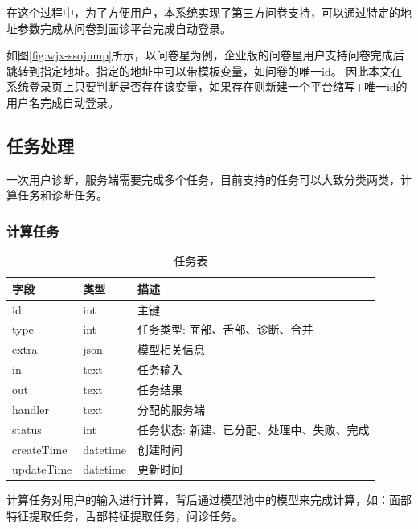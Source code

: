在这个过程中，为了方便用户，本系统实现了第三方问卷支持，可以通过特定的地址参数完成从问卷到面诊平台完成自动登录。

如图\ref{fig:wjx-ssojump}所示，以问卷星为例，企业版的问卷星用户支持问卷完成后跳转到指定地址。指定的地址中可以带模板变量，如问卷的唯一id。
因此本文在系统登录页上只要判断是否存在该变量，如果存在则新建一个平台缩写+唯一id的用户名完成自动登录。


\subsection{任务处理}
一次用户诊断，服务端需要完成多个任务，目前支持的任务可以大致分类两类，计算任务和诊断任务。


\subsubsection{计算任务}
\begin{table}[]
    \centering
    \caption{任务表}
    \begin{tabular}{lll}
        \toprule
        字段 & 类型 & 描述 \\ 
        \midrule
        id & int & 主键 \\
        type & int & 任务类型: 面部、舌部、诊断、合并 \\ 
        extra & json & 模型相关信息 \\
        in & text & 任务输入 \\
        out & text & 任务结果 \\
        handler & text & 分配的服务端 \\
        status & int & 任务状态: 新建、已分配、处理中、失败、完成 \\
        createTime & datetime & 创建时间 \\
        updateTime & datetime & 更新时间\\
        \bottomrule
    \end{tabular}
    \label{tab:task}
\end{table}
计算任务对用户的输入进行计算，背后通过模型池中的模型来完成计算，如：面部特征提取任务，舌部特征提取任务，问诊任务。

